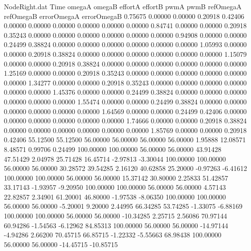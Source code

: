 \begin{filecontents}{NodeRight.dat}
Time omegaA omegaB effortA effortB pwmA pwmB refOmegaA refOmegaB errorOmegaA errorOmegaB
   0.75675    0.00000    0.00000     0.20918    0.42406    0.00000    0.00000    0.00000    0.00000    0.00000    0.00000
   0.84741    0.00000    0.00000     0.20918    0.35243    0.00000    0.00000    0.00000    0.00000    0.00000    0.00000
   0.94908    0.00000    0.00000     0.24499    0.38824    0.00000    0.00000    0.00000    0.00000    0.00000    0.00000
   1.05993    0.00000    0.00000     0.20918    0.38824    0.00000    0.00000    0.00000    0.00000    0.00000    0.00000
   1.15079    0.00000    0.00000     0.20918    0.38824    0.00000    0.00000    0.00000    0.00000    0.00000    0.00000
   1.25169    0.00000    0.00000     0.20918    0.35243    0.00000    0.00000    0.00000    0.00000    0.00000    0.00000
   1.34277    0.00000    0.00000     0.20918    0.35243    0.00000    0.00000    0.00000    0.00000    0.00000    0.00000
   1.45376    0.00000    0.00000     0.24499    0.38824    0.00000    0.00000    0.00000    0.00000    0.00000    0.00000
   1.55474    0.00000    0.00000     0.24499    0.38824    0.00000    0.00000    0.00000    0.00000    0.00000    0.00000
   1.64569    0.00000    0.00000     0.24499    0.42406    0.00000    0.00000    0.00000    0.00000    0.00000    0.00000
   1.74666    0.00000    0.00000     0.20918    0.38824    0.00000    0.00000    0.00000    0.00000    0.00000    0.00000
   1.85769    0.00000    0.00000     0.20918    0.42406   55.12500   55.12500   56.00000   56.00000   56.00000   56.00000
   1.95888   12.08571    8.48571     0.99706    0.24499  100.00000  100.00000   56.00000   56.00000   43.91428   47.51429
   2.04978   25.71428   16.45714    -2.97813   -3.30044  100.00000  100.00000   56.00000   56.00000   30.28572   39.54285
   2.16120   40.62858   25.20000    -0.97263   -6.41612  100.00000  100.00000   56.00000   56.00000   15.37142   30.80000
   2.25833   51.42857   33.17143    -1.93957   -9.20950  100.00000  100.00000   56.00000   56.00000    4.57143   22.82857
   2.34901   61.20001   46.80000    -1.97538   -8.06350  100.00000  100.00000   56.00000   56.00000   -5.20001    9.20000
   2.44995   66.34285   53.74285    -1.33075   -6.88169  100.00000  100.00000   56.00000   56.00000  -10.34285    2.25715
   2.56086   70.97144   60.94286    -1.54563   -6.12962   84.85313  100.00000   56.00000   56.00000  -14.97144   -4.94286
   2.66200   70.45715   66.85715    -1.22332   -5.55663   68.98438  100.00000   56.00000   56.00000  -14.45715  -10.85715

\end{filecontents}
